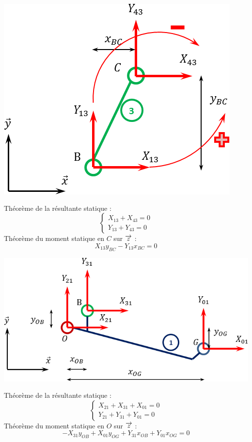 \documentclass[11pt,oneside]{article}
\begin{document}
\begin{exemple}
\begin{minipage}[c]{.35\linewidth}
\begin{center}
\includegraphics[width=.9\textwidth]{png/3}
\end{center}
\end{minipage}\hfill
\begin{minipage}[c]{.6\linewidth}
Théorème de la résultante statique : 
$$
\left\{
\begin{array}{l}
X_{13}+X_{43}=0 \\
Y_{13}+Y_{43}=0 
\end{array}
\right.
$$
Théorème du moment statique en $C$ sur $\overrightarrow{z}$ : 
$$
X_{13}y_{BC}-Y_{13}x_{BC}=0 
$$
\end{minipage}
\end{exemple}


\begin{exemple}
\begin{minipage}[c]{.5\linewidth}
\begin{center}
\includegraphics[width=.9\textwidth]{png/1}
\end{center}
\end{minipage}\hfill
\begin{minipage}[c]{.45\linewidth}
Théorème de la résultante statique : 
$$
\left\{
\begin{array}{l}
X_{21}+X_{31}+X_{01}=0 \\
Y_{21}+Y_{31}+Y_{01}=0 
\end{array}
\right.
$$
Théorème du moment statique en $O$ sur $\overrightarrow{z}$ : 
$$
-X_{31}y_{OB}+X_{01}y_{OG}+Y_{31}x_{OB}+Y_{01}x_{OG}=0 
$$
\end{minipage}
\end{exemple}
\end{document}
